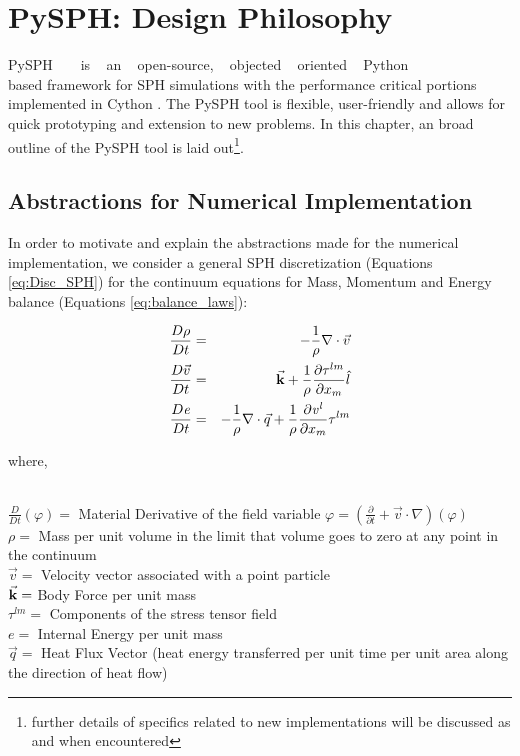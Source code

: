 \chapter{PySPH: Design Philosophy}

PySPH ~\cite{prabhu_puri} ~ is ~ an ~ open-source, ~ objected ~ oriented ~ Python\\ \cite{python} based framework for SPH simulations with the performance critical portions implemented in Cython \cite{cython}. The PySPH tool is flexible, user-friendly and allows for quick prototyping and extension to new problems. In this chapter, an broad outline of the PySPH tool is laid out\footnote[3]{further details of specifics related to new implementations will be discussed as and when encountered}.

\section{Abstractions for Numerical Implementation}

In order to motivate and explain the abstractions made for the numerical implementation, we consider a general SPH discretization (Equations \eqref{eq:Disc_SPH}) for the continuum equations for Mass, Momentum and Energy balance (Equations \eqref{eq:balance_laws}):

\begin{eqnarray} \label{eq:balance_laws}
\frac{D\rho}{Dt} &=& -\frac{1}{\rho} \nabla \cdot \vec{v} \nonumber \\
\frac{D{\vec{v}}}{Dt}&=&\vec{{\bf{k}}} + \frac{1}{\rho} \frac{\partial \tau^{lm}}{\partial x_m} \hat{l} \\
\frac{D{\it{e}}}{Dt}&=& -\frac{1}{\rho}\nabla \cdot \vec{q} + \frac{1}{\rho}\frac{\partial {\it{v}^{l}} }{\partial x_m}\tau^{lm} \nonumber
\end{eqnarray}

{\raggedright{where,}}\\
$\frac{D}{Dt}(\varphi) = $ Material Derivative of the field variable $\varphi = \left(\frac{\partial}{\partial t} + \vec{v}\cdot\nabla\right)(\varphi)$ \\
$\rho = $ Mass per unit volume in the limit that volume goes to zero at any point in the continuum\\
$\vec{v} = $ Velocity vector associated with a point particle\\
$\vec{{\bf{k}}} = $ Body Force per unit mass\\
$\tau^{lm} = $ Components of the stress tensor field\\
$e = $ Internal Energy per unit mass\\
$\vec{q} = $ Heat Flux Vector (heat energy transferred per unit time per unit area along the direction of heat flow) 

